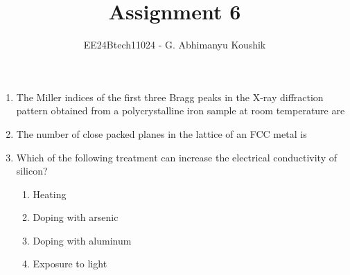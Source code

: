\documentclass[journal,12pt,onecolumn]{IEEEtran}
\theoremstyle{remark}
\begin{document}
\title{Assignment 6}
\author{EE24Btech11024 - G. Abhimanyu Koushik}
\maketitle
\renewcommand{\thefigure}{\theenumi}
\renewcommand{\thetable}{\theenumi}
\begin{enumerate}

\item The Miller indices of the first three Bragg peaks in the X-ray diffraction pattern obtained from a polycrystalline iron sample at room temperature are

\hfill{}
\begin{enumerate}
\end{enumerate}

\item The number of close packed planes in the lattice of an FCC metal is

\hfill{}
\begin{enumerate}
\end{enumerate}

\item Which of the following treatment can increase the electrical conductivity of silicon?

\begin{enumerate}[label=(\roman*)]
    \item Heating
    \item Doping with arsenic
    \item Doping with aluminum
    \item Exposure to light
\end{enumerate}

\hfill{}
\begin{enumerate}
\end{enumerate}


\end{enumerate}
\end{document}
